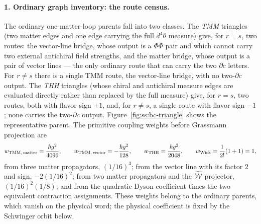 \paragraph{1. Ordinary graph inventory: the route census.}
The ordinary one-matter-loop parents fall into two classes. The \emph{TMM}
triangles (two matter edges and one edge carrying the full $d^{4}\theta$
measure) give, for $r=s$, two routes: the vector-line bridge, whose output is
a $\Phi\widetilde\Phi$ pair and which cannot carry two external antichiral
field strengths, and the matter bridge, whose output is a pair of vector
lines --- the only ordinary route that can carry the two $\partial c$ letters.
For $r\neq s$ there is a single TMM route, the vector-line bridge, with no
two-$\partial c$ output. The \emph{THH} triangles (whose chiral and antichiral
measure edges are evaluated directly rather than replaced by the full measure)
give, for $r=s$, two routes, both with flavor sign $+1$, and, for $r\neq s$, a
single route with flavor sign $-1$; none carries the two-$\partial c$ output.
Figure~\ref{fig:ss:bc-triangle} shows the representative parent. The primitive
coupling weights before Grassmann projection are
\begin{equation}\label{eq:ss:bc:weights}
w_{\mathrm{TMM,\,matter}}=\frac{\hbar g^{2}}{4096},
\qquad
w_{\mathrm{TMM,\,vector}}=-\frac{\hbar g^{2}}{128},
\qquad
w_{\mathrm{THH}}=\frac{\hbar g^{2}}{2048},
\qquad
w_{\mathrm{Wick}}=\frac{1}{2!}(1+1)=1 ,
\end{equation}
from three matter propagators, $(1/16)^{3}$; from the vector line with its
factor $2$ and sign, $-2(1/16)^{2}$; from two matter propagators and the
$\widetilde{\mathcal{W}}$ projector, $(1/16)^{2}(1/8)$; and from the quadratic Dyson coefficient
times the two equivalent contraction assignments. These weights belong to the
ordinary parents, which vanish on the physical word; the physical coefficient
is fixed by the Schwinger orbit below.

